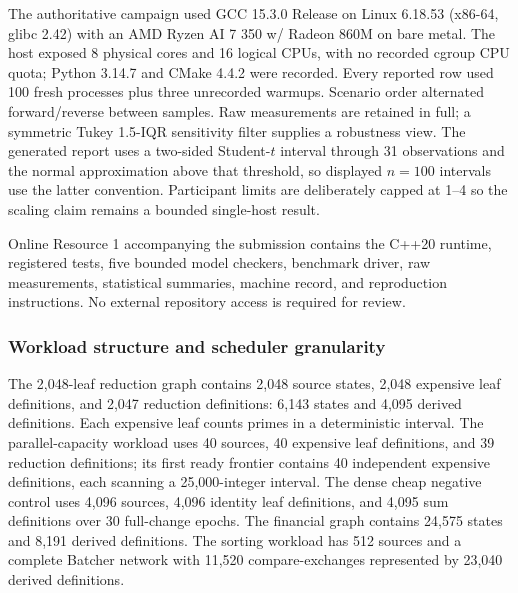 The authoritative campaign used GCC 15.3.0 Release on Linux 6.18.53 (x86-64, glibc 2.42) with an AMD Ryzen AI 7 350 w/ Radeon 860M on bare metal. The host exposed 8 physical cores and 16 logical CPUs, with no recorded cgroup CPU quota; Python 3.14.7 and CMake 4.4.2 were recorded. Every reported row used 100 fresh processes plus three unrecorded warmups. Scenario order alternated forward/reverse between samples. Raw measurements are retained in full; a symmetric Tukey 1.5-IQR sensitivity filter supplies a robustness view. The generated report uses a two-sided Student-$t$ interval through 31 observations and the normal approximation above that threshold, so displayed $n=100$ intervals use the latter convention. Participant limits are deliberately capped at 1--4 so the scaling claim remains a bounded single-host result.

Online Resource 1 accompanying the submission contains the C++20 runtime, registered tests, five bounded model checkers, benchmark driver, raw measurements, statistical summaries, machine record, and reproduction instructions. No external repository access is required for review.

\subsubsection{Workload structure and scheduler granularity}
The 2,048-leaf reduction graph contains 2,048 source states, 2,048 expensive leaf definitions, and 2,047 reduction definitions: 6,143 states and 4,095 derived definitions. Each expensive leaf counts primes in a deterministic interval. The parallel-capacity workload uses 40 sources, 40 expensive leaf definitions, and 39 reduction definitions; its first ready frontier contains 40 independent expensive definitions, each scanning a 25,000-integer interval. The dense cheap negative control uses 4,096 sources, 4,096 identity leaf definitions, and 4,095 sum definitions over 30 full-change epochs. The financial graph contains 24,575 states and 8,191 derived definitions. The sorting workload has 512 sources and a complete Batcher network with 11,520 compare-exchanges represented by 23,040 derived definitions.

